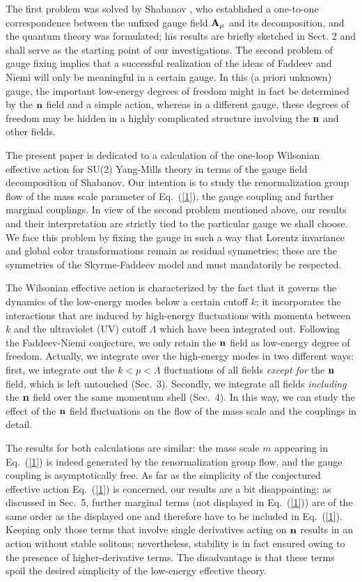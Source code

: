 \documentclass[a4paper,12pt]{article}
\newcommand{\re}[1]{~(\ref{#1})}
\begin{document}
The first problem was solved by Shabanov
\cite{Shabanov:1999xy,Shabanov:1999uv}, who established a one-to-one
correspondence between the unfixed gauge field $\mathbf{A}_\mu$ and its
decomposition, and the quantum theory was formulated; his results are
briefly sketched in Sect. 2 and shall serve as the starting point of
our investigations. The second problem of gauge fixing implies that a
successful realization of the ideas of Faddeev and Niemi will only be
meaningful in a certain gauge. In this (a priori unknown) gauge, the
important low-energy degrees of freedom might in fact be determined by
the $\mathbf{n}$ field and a simple action, whereas in a different gauge,
these degrees of freedom may be hidden in a highly complicated
structure involving the $\mathbf{n}$ and other fields.

The present paper is dedicated to a calculation of the one-loop
Wilsonian effective action for SU(2) Yang-Mills theory in terms of the
gauge field decomposition of Shabanov. Our intention is to study the
renormalization group flow of the mass scale parameter of Eq.\re{1},
the gauge coupling and further marginal couplings. In view of the
second problem mentioned above, our results and their interpretation
are strictly tied to the particular gauge we shall choose. We
face this problem by fixing the gauge in such a way that Lorentz
invariance and global color transformations remain as residual
symmetries; these are the symmetries of the Skyrme-Faddeev model and
must mandatorily be respected.

The Wilsonian effective action is characterized by the fact that it
governs the dynamics of the low-energy modes below a certain cutoff
$k$; it incorporates the interactions that are induced by high-energy
fluctuations with momenta between $k$ and the ultraviolet (UV) cutoff
$\Lambda$ which have been integrated out. Following the Faddeev-Niemi
conjecture, we only retain the $\mathbf{n}$ field as low-energy degree of
freedom. Actually, we integrate over the high-energy modes in two
different ways: first, we integrate out the $k<p<\Lambda$ fluctuations
of all fields {\em except for} the $\mathbf{n}$ field, which is left
untouched (Sec.~3). Secondly, we integrate all fields {\em including}
the $\mathbf{n}$ field over the same momentum shell (Sec.~4). In this way, we
can study the effect of the $\mathbf{n}$ field fluctuations on the flow of
the mass scale and the couplings in detail.

The results for both calculations are similar: the mass scale $m$
appearing in Eq.\re{1} is indeed generated by the renormalization
group flow, and the gauge coupling is asymptotically free. As far as
the simplicity of the conjectured effective action Eq.\re{1} is
concerned, our results are a bit disappointing: as discussed in
Sec.~5, further marginal terms (not displayed in Eq.\re{1}) are of the
same order as the displayed one and therefore have to be included in
Eq.\re{1}. Keeping only those terms that involve single
derivatives acting on $\mathbf{n}$ results in an action without stable
solitons; nevertheless, stability is in fact ensured owing to the
presence of higher-derivative terms. The disadvantage is that these
terms spoil the desired simplicity of the low-energy effective
theory. 
\end{document}
